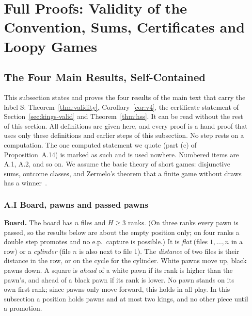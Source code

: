 \section{Full Proofs: Validity of the Convention, Sums, Certificates and Loopy Games}\label{S-kingsproof}
\subsection{The Four Main Results, Self-Contained}\label{S-core}

This subsection states and proves the four results of the main text that carry the label S: Theorem~\ref{thm:validity},
Corollary~\ref{cor:v4}, the certificate statement of Section~\ref{sec:kings-valid} and Theorem~\ref{thm:hss}. It can be
read without the rest of this section. All definitions are given here, and every proof is a hand proof that uses only
these definitions and earlier steps of this subsection. No step rests on a computation. The one computed statement we
quote (part (c) of Proposition~A.14) is marked as such and is used nowhere. Numbered items are A.1, A.2, and so on.
We assume the basic theory of short games: disjunctive sums, outcome classes, and Zermelo's theorem that a finite game
without draws has a winner~\cite{Siegel2013}.

\subsubsection*{A.I Board, pawns and passed pawns}

\textbf{Board.} The board has $n$ files and $H\ge 3$ ranks. (On three ranks every pawn is passed, so the results below are about the empty position only; on four ranks a double step
promotes and no e.p.\ capture is possible.) It is \emph{flat} (files $1,\dots,n$ in a row) or a
\emph{cylinder} (file $n$ is also next to file $1$). The \emph{distance} of two files is their distance in the row, or
on the cycle for the cylinder. White pawns move up, black pawns down. A square is \emph{ahead} of a white pawn if its rank is higher than the pawn's, and ahead of a black pawn if
its rank is lower. No pawn stands on its own first rank; since pawns only move forward, this holds in all play. In this subsection a position holds pawns and at most two
kings, and no other piece until a promotion.

